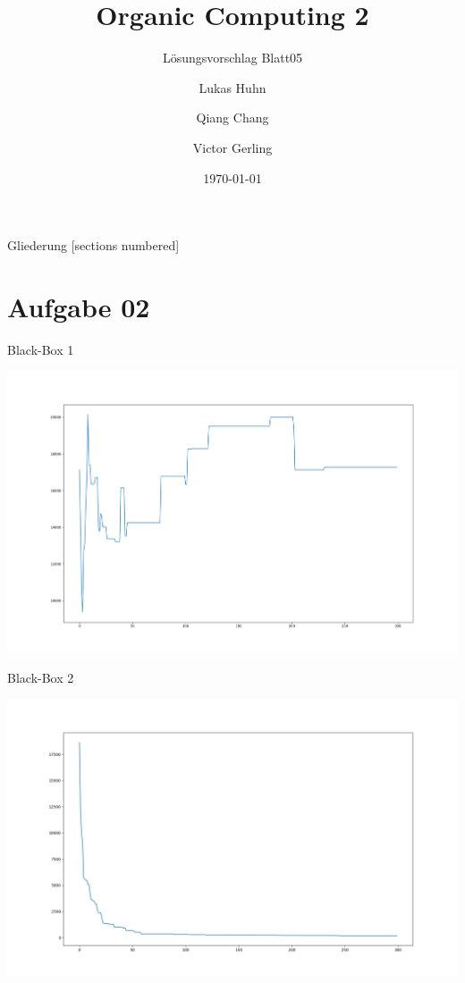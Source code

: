 \documentclass{ocbeameruni}
\title{Organic Computing 2}
\subtitle{Lösungsvorschlag Blatt05}
\date{\today}
\author{Lukas Huhn \and Qiang Chang \and Victor Gerling}
\institute{%
  Universität Augsburg\\
  Institut für Informatik\\
  Lehrstuhl für Organic Computing
}
\begin{document}
\maketitle


\begin{frame}{Gliederung}
  [sections numbered]
  \tableofcontents
\end{frame}

\section{Aufgabe 02}

\begin{frame}{Black-Box 1}
    \begin{center}
    \includegraphics[scale=0.16]{plots/bb1.png}
    \end{center}
\end{frame}

\begin{frame}{Black-Box 2}
    \begin{center}
    \includegraphics[scale=0.16]{plots/bb2.png}
    \end{center}
\end{frame}
\end{document}
